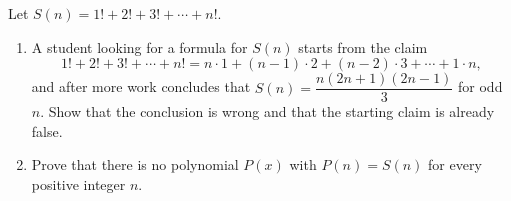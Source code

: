 Let $S(n)=1!+2!+3!+\cdots+n!$.
\begin{enumerate}
\item[(a)] A student looking for a formula for $S(n)$ starts from the claim
\[1!+2!+3!+\cdots+n!=n\cdot1+(n-1)\cdot2+(n-2)\cdot3+\cdots+1\cdot n,\]
and after more work concludes that $S(n)=\dfrac{n(2n+1)(2n-1)}{3}$ for odd $n$. Show that the conclusion is wrong and that the starting claim is already false.
\item[(b)] Prove that there is no polynomial $P(x)$ with $P(n)=S(n)$ for every positive integer $n$.
\end{enumerate}
